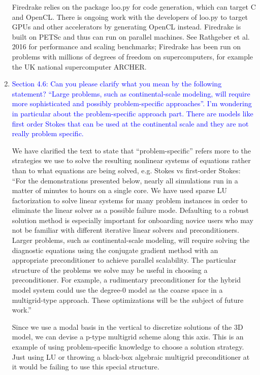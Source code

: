 \documentclass{article}
\theoremstyle{definition}
\theoremstyle{plain}
\begin{document}
\begin{enumerate}
Firedrake relies on the package loo.py for code generation, which can target C and OpenCL.
There is ongoing work with the developers of loo.py to target GPUs and other accelerators by generating OpenCL instead.
Firedrake is built on PETSc and thus can run on parallel machines.
See Rathgeber et al. 2016 for performance and scaling benchmarks; Firedrake has been run on problems with millions of degrees of freedom on supercomputers, for example the UK national supercomputer ARCHER.

\item \textcolor{blue}{Section 4.6: Can you please clarify what you mean by the following statement? ``Large problems,
such as continental-scale modeling, will require more sophisticated and possibly problem-specific
approaches''. I’m wondering in particular about the problem-specific approach part. There are
models like first order Stokes that can be used at the continental scale and they are not really
problem specific.}

We have clarified the text to state that ``problem-specific'' refers more to the strategies we use to solve the resulting nonlinear systems of equations rather than to what equations are being solved, e.g. Stokes vs first-order Stokes:
``For the demonstrations presented below, nearly all simulations run in a matter of minutes to hours on a single core.
We have used sparse LU factorization to solve linear systems for many problem instances in order to eliminate the linear solver as a possible failure mode.
Defaulting to a robust solution method is especially important for onboarding novice users who may not be familiar with different iterative linear solvers and preconditioners.
Larger problems, such as continental-scale modeling, will require solving the diagnostic equations using the conjugate gradient method with an appropriate preconditioner to achieve parallel scalability.
The particular structure of the problems we solve may be useful in choosing a preconditioner.
For example, a rudimentary preconditioner for the hybrid model system could use the degree-0 model as the coarse space in a multigrid-type approach.
These optimizations will be the subject of future work.''

Since we use a modal basis in the vertical to discretize solutions of the 3D model, we can devise a p-type multigrid scheme along this axis.
This is an example of using problem-specific knowledge to choose a solution strategy.
Just using LU or throwing a black-box algebraic multigrid preconditioner at it would be failing to use this special structure.


\end{enumerate}
\end{document}
